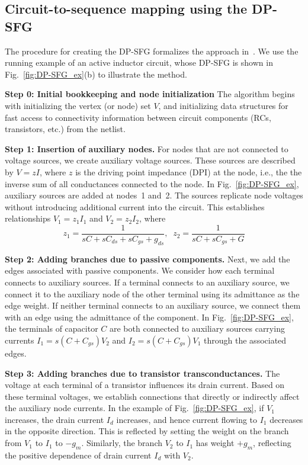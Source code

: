 \subsection{Circuit-to-sequence mapping using the DP-SFG}
\label{sec:dp-sfg}


\noindent
The procedure for creating the DP-SFG formalizes the approach in~\cite{schmid_18,schmid_yt}. We use the running example of an active inductor circuit, whose DP-SFG is shown in Fig.~\ref{fig:DP-SFG_ex}(b) to illustrate the method.


\noindent
\textbf{Step 0: Initial bookkeeping and node initialization}
The algorithm begins with initializing the vertex (or node) set $V$, and initializing data structures for fast access to connectivity information between circuit components (RCs, transistors, etc.) from the netlist. 

\noindent
\textbf{Step 1: Insertion of auxiliary nodes.} 
For nodes that are not connected to voltage sources, we create auxiliary voltage sources. These sources are described by $V = z I$, where $z$ is the driving point impedance (DPI) at the node, i.e., the the inverse sum of all conductances connected to the node. In Fig.~\ref{fig:DP-SFG_ex}, auxiliary sources are added at nodes~1 and~2. The sources replicate node voltages without introducing additional current into the circuit.  This establishes relationships $V_1 = z_1 I_1 $ and $V_2 = z_2 I_2$, where 
\begin{equation}
z_1 = \frac{1}{sC+sC_{\textit{ds}}+sC_{\textit{gs}}+g_{\textit{ds}}}, \; \;
z_2 = \frac{1}{sC+sC_{\textit{gs}}+G}
\end{equation}

\noindent
\textbf{Step 2: Adding branches due to passive components.} Next, we add the edges associated with passive components. We consider how each terminal connects to auxiliary sources. If a terminal connects to an auxiliary source, we connect it to the auxiliary node of the other terminal using its admittance as the edge weight. If neither terminal connects to an auxiliary source, we connect them with an edge using the admittance of the component. In Fig.~\ref{fig:DP-SFG_ex}, the terminals of capacitor \( C \) are both connected to auxiliary sources carrying currents \( I_1=s(C + C_{\textit{gs}}) V_2 \) and \( I_2=s(C + C_{\textit{gs}}) V_1 \) through the associated edges.

\noindent
\textbf{Step 3: Adding branches due to transistor transconductances.} 
The voltage at each terminal of a transistor influences its drain current. Based on these terminal voltages, we establish connections that directly or indirectly affect the auxiliary node currents. In the example of Fig.~\ref{fig:DP-SFG_ex}, if $V_1$ increases, the drain current $I_d$ increases, and hence current flowing to $I_1$ decreases in the opposite direction. This is reflected by setting the weight on the branch from $V_1$ to $I_1$ to $-g_m$. Similarly, the branch $V_2$ to $I_1$ has weight $+g_m$, reflecting the positive dependence of drain current $I_d$ with $V_2$. 

